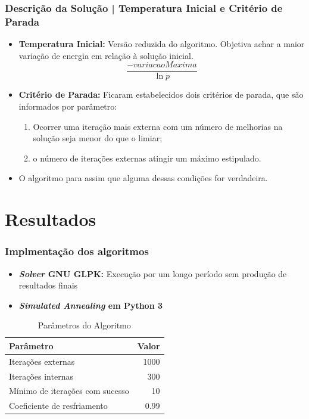 \documentclass{beamer}
\begin{document}
\begin{frame}
\frametitle{Descrição da Solução | Temperatura Inicial e Critério de Parada}
\begin{itemize}
\item \textbf{Temperatura Inicial:} Versão reduzida do algoritmo. Objetiva achar a maior variação de energia em relação à solução inicial.
\begin{displaymath}
\frac{-variacaoMaxima}{\ln p}
\end{displaymath}
\item \textbf{Critério de Parada:} Ficaram estabelecidos dois critérios de parada, que são informados por parâmetro:
	\begin{enumerate}
	\item Ocorrer uma iteração mais externa com um número de melhorias na solução seja menor do que o limiar;
	\item o número de iterações externas atingir um máximo estipulado.
	\end{enumerate}
\item O algoritmo para assim que alguma dessas condições for verdadeira.
\end{itemize}
\end{frame}

\section{Resultados}

\begin{frame}
\frametitle{Implmentação dos algoritmos}
\begin{itemize}
\item \textbf{\emph{Solver} GNU GLPK:} Execução por um longo período sem produção de resultados finais
\item \textbf{\emph{Simulated Annealing} em Python 3}
\end{itemize}
\begin{table}[H]
\centering
\begin{tabular}{|l | r |}
	\hline
	\textbf{Parâmetro} & \textbf{Valor} \\ \hline
	Iterações externas		& 1000	\\ \hline
	Iterações internas		& 300	\\ \hline
	Mínimo de iterações com sucesso	& 10 	\\ \hline
	Coeficiente de resfriamento		& 0.99	\\ \hline
\end{tabular}
\caption{Parâmetros do Algoritmo}
\label{tab:Parametros}
\end{table}
\end{frame}
\end{document}
